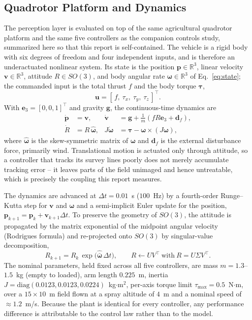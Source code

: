\documentclass[12pt,a4paper]{article}
\begin{document}
\subsection{Quadrotor Platform and Dynamics}
The perception layer is evaluated on top of the same agricultural quadrotor platform and
the same five controllers as the companion controls study, summarized here so that this
report is self-contained. The vehicle is a rigid body with six degrees of freedom and
four independent inputs, and is therefore an underactuated nonlinear system. Its state is
the position $\mathbf{p}\in\mathbb{R}^3$, linear velocity $\mathbf{v}\in\mathbb{R}^3$,
attitude $R\in SO(3)$, and body angular rate $\bm{\omega}\in\mathbb{R}^3$ of
Eq.~\eqref{eq:state}; the commanded input is the total thrust $f$ and the body torque
$\bm{\tau}$,
\begin{equation}
    \mathbf{u} = [\,f,\ \tau_x,\ \tau_y,\ \tau_z\,]^{\top}. \label{eq:input}
\end{equation}
With $\mathbf{e}_3=[0,0,1]^{\top}$ and gravity $\mathbf{g}$, the continuous-time dynamics
are
\begin{align}
    \dot{\mathbf{p}} &= \mathbf{v}, &
    \dot{\mathbf{v}} &= \mathbf{g} + \tfrac{1}{m}\!\left(fR\mathbf{e}_3 + \mathbf{d}_f\right), \\
    \dot{R} &= R\,\hat{\bm{\omega}}, &
    J\dot{\bm{\omega}} &= \bm{\tau} - \bm{\omega}\times(J\bm{\omega}),
    \label{eq:dyn}
\end{align}
where $\hat{\bm{\omega}}$ is the skew-symmetric matrix of $\bm{\omega}$ and
$\mathbf{d}_f$ is the external disturbance force, primarily wind. Translational motion is
actuated only through attitude, so a controller that tracks its survey lines poorly does
not merely accumulate tracking error -- it leaves parts of the field unimaged and hence
untreatable, which is precisely the coupling this report measures.

The dynamics are advanced at $\Delta t = 0.01$~s ($100$~Hz) by a fourth-order
Runge--Kutta step for $\mathbf{v}$ and $\bm{\omega}$ and a semi-implicit Euler update for
the position, $\mathbf{p}_{k+1} = \mathbf{p}_k + \mathbf{v}_{k+1}\Delta t$. To preserve the geometry of $SO(3)$, the attitude is propagated by the
matrix exponential of the midpoint angular velocity (Rodrigues formula) and re-projected
onto $SO(3)$ by singular-value decomposition,
\begin{equation}
    R_{k+1} = R_k\,\exp\!\big(\hat{\bar{\bm{\omega}}}\,\Delta t\big), \qquad
    R \leftarrow UV^{\top}\ \text{with}\ R = U\Sigma V^{\top}. \label{eq:so3}
\end{equation}
The nominal parameters, held fixed across all five controllers, are mass
$m = 1.3$--$1.5$~kg (empty to loaded), arm length $0.225$~m, inertia
$J = \mathrm{diag}(0.0123,0.0123,0.0224)$~kg$\cdot$m$^2$, per-axis torque limit
$\tau_{\max}=0.5$~N$\cdot$m, over a $15\times10$~m field flown at a spray altitude of
$4$~m and a nominal speed of $\approx 1.2$~m/s. Because the plant is identical for every
controller, any performance difference is attributable to the control law rather than to
the model.
\end{document}
